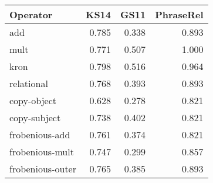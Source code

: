 \begin{tabular}{lrrr}
\toprule
Operator &   KS14 &   GS11 &  PhraseRel \\
\midrule
add              &  0.785 &  0.338 &      0.893 \\
mult             &  0.771 &  0.507 &      1.000 \\
kron             &  0.798 &  0.516 &      0.964 \\
relational       &  0.768 &  0.393 &      0.893 \\
copy-object      &  0.628 &  0.278 &      0.821 \\
copy-subject     &  0.738 &  0.402 &      0.821 \\
frobenious-add   &  0.761 &  0.374 &      0.821 \\
frobenious-mult  &  0.747 &  0.299 &      0.857 \\
frobenious-outer &  0.765 &  0.385 &      0.893 \\
\bottomrule
\end{tabular}
